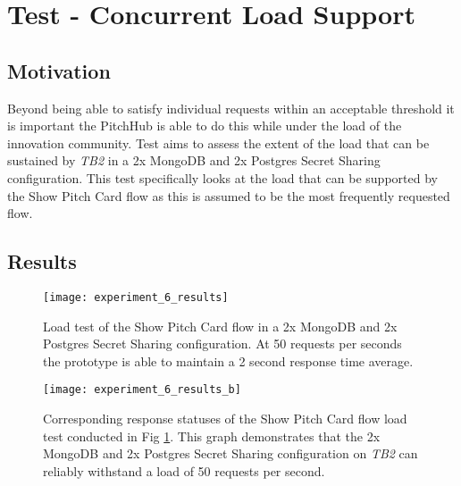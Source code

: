 \section{Test  - Concurrent Load Support}
\subsection{Motivation}
Beyond being able to satisfy individual requests within an acceptable threshold it is important the PitchHub is able to do this while under the load of the innovation community. Test  aims to assess the extent of the load that can be sustained by \textit{TB2} in a 2x MongoDB and 2x Postgres Secret Sharing configuration. This test specifically looks at the load that can be supported by the Show Pitch Card flow as this is assumed to be the most frequently requested flow.

\subsection{Results}

\begin{figure}[ht]
    \centering
    \texttt{[image: experiment\_6\_results]}
    \caption{Load test of the Show Pitch Card flow in a 2x MongoDB and 2x Postgres Secret Sharing configuration. At 50 requests per seconds the prototype is able to maintain a 2 second response time average. }
    \label{fig:test_6_results}
\end{figure}

\begin{figure}[ht]
    \centering
    \texttt{[image: experiment\_6\_results\_b]}
    \caption{Corresponding response statuses of the Show Pitch Card flow load test conducted in Fig \ref{fig:test_6_results}. This graph demonstrates that the 2x MongoDB and 2x Postgres Secret Sharing configuration on \textit{TB2} can reliably withstand a load of 50 requests per second.}
    \label{fig:test_6_results_b}
\end{figure}

